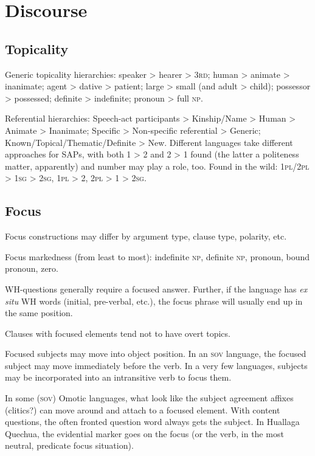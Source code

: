\documentclass[11pt]{article}
\newcommand{\I}[1]{\textsc{#1}}   %
\begin{document}
\section{Discourse}

\subsection{Topicality}
Generic topicality hierarchies: speaker > hearer > \I{3rd}; human >
animate > inanimate; agent > dative > patient; large > small (and
adult > child); possessor > possessed; definite > indefinite; pronoun
> full \I{np}.

Referential hierarchies: Speech-act participants > Kinship/Name >
Human > Animate > Inanimate; Specific > Non-specific referential >
Generic; Known/Topical/Thematic/Definite > New.  Different languages
take different approaches for SAPs, with both 1 > 2 and 2 > 1 found
(the latter a politeness matter, apparently) and number may play a
role, too. Found in the wild: \I{1pl/2pl > 1sg > 2sg}, \I{1pl > 2},
\I{2pl > 1 > 2sg}.

\subsection{Focus}
Focus constructions may differ by argument type, clause type,
polarity, etc.

Focus markedness (from least to most): indefinite \I{np}, definite
\I{np}, pronoun, bound pronoun, zero.

WH-questions generally require a focused answer.  Further, if the
language has \textit{ex situ} WH words (initial, pre-verbal, etc.),
the focus phrase will usually end up in the same position.

Clauses with focused elements tend not to have overt topics.

Focused subjects may move into object position. In an \I{sov}
language, the focused subject may move immediately before the verb.
In a very few languages, subjects may be incorporated into an
intransitive verb to focus them.

In some (\I{sov}) Omotic languages, what look like the subject
agreement affixes (clitics?) can move around and attach to a focused
element.  With content questions, the often fronted question word
always gets the subject.  In Huallaga Quechua, the evidential marker
goes on the focus (or the verb, in the most neutral, predicate focus
situation).
\end{document}
